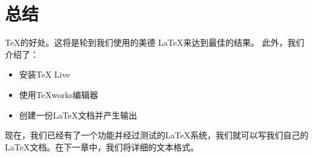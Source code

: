 \section{总结}

TeX的好处。这将是轮到我们使用的美德
LaTeX来达到最佳的结果。
此外，我们介绍了：
\begin{itemize}
	\item {安装TeX Live}
	\item {使用TeXworks编辑器}
	\item {创建一份LaTeX文档并产生输出}
\end{itemize}
现在，我们已经有了一个功能并经过测试的LaTeX系统，我们就可以写我们自己的
LaTeX文档。在下一章中，我们将详细的文本格式。
